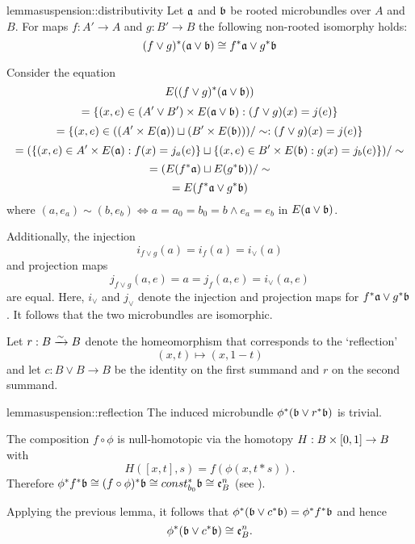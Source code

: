 \begin{mystatement}{lemma}{suspension::distributivity}
    Let $\mathfrak{a}$ and $\bb$ be rooted microbundles over $A$ and $B$.
    For maps $f: A' \to A$ and $g: B' \to B$ the following non-rooted isomorphy holds:
    \[ \ind{(f \vee g)}(\ba \vee \bb) \cong \ind{f}\ba \vee \ind{g}\bb \]
\end{mystatement}

\begin{myproof}
    Consider the equation
    \[ E(\ind{(f \vee g)}(\ba \vee \bb)) \]
    \[ = \set{(x, e) \in (A' \vee B') \cross E(\ba \vee \bb)}{(f \vee g)(x) = j(e)} \]
    \[ = \set{(x, e) \in ((A' \cross E(\ba)) \sqcup (B' \cross E(\bb))) / \sim}{(f \vee g)(x) = j(e)} \]
    \[ = (\set{(x, e) \in A' \cross E(\ba)}{f(x) = j_a(e)} \sqcup \set{(x, e) \in B' \cross E(\bb)}{g(x) = j_b(e)}) / \sim \]
    \[ = (E(\ind{f}\ba) \sqcup E(\ind{g}\bb)) / \sim \]
    \[ = E(\ind{f}\ba \vee \ind{g}\bb) \]
    where $(a, e_a) \sim (b, e_b) \iff a = a_0 = b_0 = b \land e_a = e_b$ in $E(\ba \vee \bb)$.

    Additionally, the injection
    \[ i_{f \vee g}(a) = i_f(a) = i_{\vee}(a) \]
    and projection maps
    \[ j_{f \vee g}(a, e) = a = j_f(a, e) = i_{\vee}(a, e) \]
    are equal.
    Here, $i_\vee$ and $j_\vee$ denote the
    injection and projection maps for $\ind{f}\ba \vee \ind{g}\bb$.
    It follows that the two microbundles are isomorphic.
\end{myproof}

\begin{myparagraph}
    Let $r: B \xrightarrow{\sim} B$ denote the homeomorphism that corresponds to the `reflection'
    \[ (x, t) \mapsto (x, 1 - t)\]
    and let $c: B \vee B \to B$ be the identity on the first summand and $r$ on the second summand.
\end{myparagraph}

\begin{mystatement}{lemma}{suspension::reflection}
    The induced microbundle $\ind{\phi}(\bb \vee \ind{r}\bb)$ is trivial.
\end{mystatement}
\begin{myproof}
    The composition $f \circ \phi$ is null-homotopic via the homotopy $H: B \times [0, 1] \to B$ with
    \[ H([x, t], s) = f(\phi(x, t * s)). \]
    Therefore $\ind{\phi}\ind{f}\bb \cong \ind{(f \circ \phi)}\bb\cong \ind{const_{b_0}}\bb \cong \be{B}$ (see ).
    
    Applying the previous lemma, it follows that $\ind{\phi}(\bb \vee \ind{c}\bb) = \ind{\phi}\ind{f}\bb$ and hence
    \[ \ind{\phi}(\bb \vee \ind{c}\bb) \cong \be{B}. \]
\end{myproof}